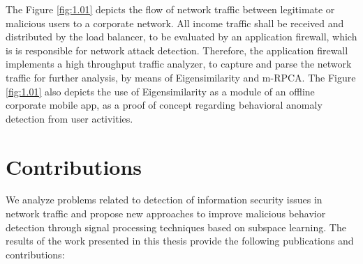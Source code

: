 The Figure \ref{fig:1.01} depicts the flow of network traffic between legitimate or malicious users to a corporate network. All income traffic shall be received and distributed by the load balancer, to be evaluated by an application firewall, which is is responsible for network attack detection. Therefore, the application firewall implements a high throughput traffic analyzer, to capture and parse the network traffic for further analysis, by means of Eigensimilarity and m-RPCA. The Figure \ref{fig:1.01} also depicts the use of Eigensimilarity as a module of an offline corporate mobile app, as a proof of concept regarding behavioral anomaly detection from user activities.


\section{Contributions}
\label{sec:1_contributions}

We analyze problems related to detection of information security issues in network traffic and propose new approaches to improve malicious behavior detection through signal processing techniques based on subspace learning. The results of the work presented in this thesis provide the following publications and contributions:

